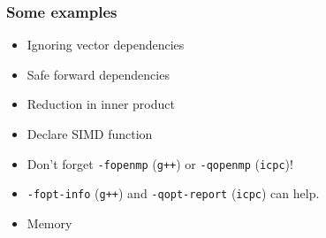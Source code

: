 \documentclass[14pt,aspectratio=169,dvipsnames,table]{beamer}
\begin{document}
  \begin{frame}[fragile]
  \frametitle{Some examples}
  \begin{itemize}[wide=0pt, itemsep=7pt, topsep=7pt]
  \item \parbox{10cm}{Ignoring vector dependencies}
    \href{https://godbolt.org/z/jTzGnvo78}{\faCog}
    \raisebox{1pt}{$\Rightarrow$}
    \href{https://godbolt.org/z/jbhjbqnxv}{\faCog}

  \item \parbox{10cm}{Safe forward dependencies}
    \href{https://godbolt.org/z/b8TTafEE1}{\faCog}
    \raisebox{1pt}{$\Rightarrow$}
    \href{https://godbolt.org/z/sebheva11}{\faCog}
    \raisebox{1pt}{$\Rightarrow$}
    \href{https://godbolt.org/z/Yq7jfq1xn}{\faCog}



  \item \parbox{10cm}{Reduction in inner product}
    \href{https://godbolt.org/z/sfYM7cedq}{\faCog}
    \raisebox{1pt}{$\Rightarrow$}
    \href{https://godbolt.org/z/eqrcTvWE9}{\faCog}

  \item \parbox{10cm}{Declare SIMD function}
    \href{https://godbolt.org/z/o55vPqY9z}{\faCog}
    \raisebox{1pt}{$\Rightarrow$}
    \href{https://godbolt.org/z/EKEnxYPxc}{\faCog}

  \end{itemize}

  \vskip 11pt
  \pause

  \begin{itemize}[wide=0pt, itemsep=7pt, topsep=7pt]
  \item Don't forget \verb#-fopenmp# (\verb#g++#) or
    \verb#-qopenmp# (\verb#icpc#)!
  \item  \verb#-fopt-info# (\verb#g++#) and
    \verb#-qopt-report# (\verb#icpc#) can help.
  \item \parbox{10cm}{Memory }
    \href{https://godbolt.org/z/n6sEK79d3}{\faCog}
    \raisebox{1pt}{$\Rightarrow$}
    \href{https://godbolt.org/z/9hdKvo6ez}{\faCog}
  \end{itemize}

\end{frame}
\end{document}
